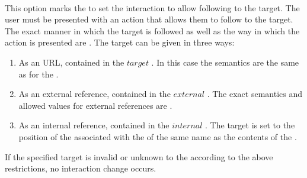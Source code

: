  \\

This option marks the  to set the interaction to allow following to the target. The user must be presented with an action that allows them to follow to the target. The exact manner in which the target is followed as well as the way in which the action is presented are . The target can be given in three ways:
\begin{enumerate}
\item As an URL, contained in the \inline$target$ . In this case the semantics are the same as for the  .
\item As an external reference, contained in the \inline$external$ . The exact semantics and allowed values for external references are .
\item As an internal reference, contained in the \inline$internal$ . The target is set to the position of the  associated with the  of the same name as the contents of the .
\end{enumerate}
If the specified target is invalid or unknown to the  according to the above restrictions, no interaction change occurs. \\

\begin{examples}
\end{examples}

